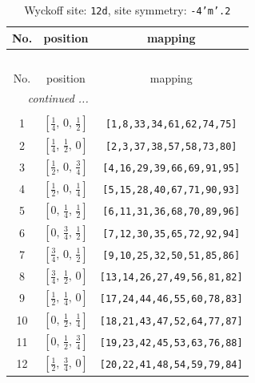 \documentclass[fleqn,8pt]{jsarticle}
\begin{document}
\begin{longtable}{ccc}
\caption{Wyckoff site: {\tt 12d}, site symmetry: {\tt -4'm'.2}}
 \\
 \hline \hline
No. & position & mapping \\ \hline \endfirsthead

\multicolumn{2}{l}{\tablename\ \thetable{}} \\
 \hline \hline
No. & position & mapping \\ \hline \endhead

 \hline \hline
\multicolumn{2}{r}{\footnotesize\it continued ...} \\ \endfoot

 \hline \hline
\multicolumn{2}{r}{} \\ \endlastfoot

1 & $\left[ \frac{1}{4},\, 0,\, \frac{1}{2} \right]$ & {\tt [1,8,33,34,61,62,74,75]} \\ \hline
2 & $\left[ \frac{1}{4},\, \frac{1}{2},\, 0 \right]$ & {\tt [2,3,37,38,57,58,73,80]} \\ \hline
3 & $\left[ \frac{1}{2},\, 0,\, \frac{3}{4} \right]$ & {\tt [4,16,29,39,66,69,91,95]} \\ \hline
4 & $\left[ \frac{1}{2},\, 0,\, \frac{1}{4} \right]$ & {\tt [5,15,28,40,67,71,90,93]} \\ \hline
5 & $\left[ 0,\, \frac{1}{4},\, \frac{1}{2} \right]$ & {\tt [6,11,31,36,68,70,89,96]} \\ \hline
6 & $\left[ 0,\, \frac{3}{4},\, \frac{1}{2} \right]$ & {\tt [7,12,30,35,65,72,92,94]} \\ \hline
7 & $\left[ \frac{3}{4},\, 0,\, \frac{1}{2} \right]$ & {\tt [9,10,25,32,50,51,85,86]} \\ \hline
8 & $\left[ \frac{3}{4},\, \frac{1}{2},\, 0 \right]$ & {\tt [13,14,26,27,49,56,81,82]} \\ \hline
9 & $\left[ \frac{1}{2},\, \frac{1}{4},\, 0 \right]$ & {\tt [17,24,44,46,55,60,78,83]} \\ \hline
10 & $\left[ 0,\, \frac{1}{2},\, \frac{1}{4} \right]$ & {\tt [18,21,43,47,52,64,77,87]} \\ \hline
11 & $\left[ 0,\, \frac{1}{2},\, \frac{3}{4} \right]$ & {\tt [19,23,42,45,53,63,76,88]} \\ \hline
12 & $\left[ \frac{1}{2},\, \frac{3}{4},\, 0 \right]$ & {\tt [20,22,41,48,54,59,79,84]} \\
\end{longtable}
\renewcommand{\arraystretch}{1.2}
\end{document}
